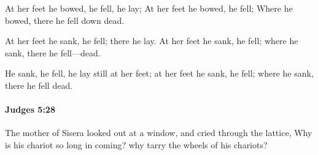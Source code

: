 			\begin{versebox}
					\item[BHS] 
					\item[ASV] At her feet he bowed, he fell, he lay; At her feet he bowed, he fell; Where he bowed, there he fell down dead.
					\item[NIV] At her feet he sank, he fell; there he lay. At her feet he sank, he fell; where he sank, there he fell—dead.
					\item[NRSV] He sank, he fell, he lay still at her feet; at her feet he sank, he fell; where he sank, there he fell dead.
			\end{versebox}

		\paragraph{Judges 5:28} %
			\label{JUDGES-5-28}

			The mother of Sisera looked out at a window, and cried through the lattice, Why is his chariot so long in coming? why tarry the wheels of his chariots?

